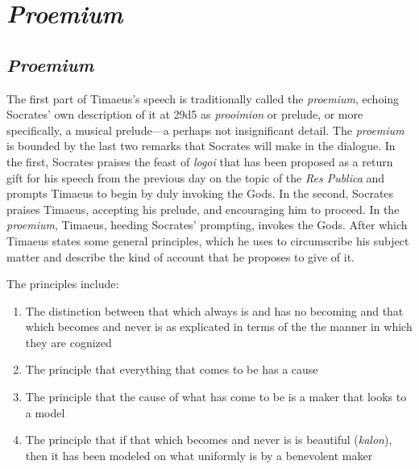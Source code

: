 
\chapter{\emph{Proemium}} %
\label{cha:proemium}

%
%


\section{\emph{Proemium}} %
\label{sec:proemium}

The first part of Timaeus's speech is traditionally called the \emph{proemium}, echoing Socrates' own description of it at 29d5 as \emph{prooimion} or prelude, or more specifically, a musical prelude---a perhaps not insignificant detail. The \emph{proemium} is bounded by the last two remarks that Socrates will make in the dialogue. In the first, Socrates praises the feast of \emph{logoi} that has been proposed as a return gift for his speech from the previous day on the topic of the \emph{Res Publica} and prompts Timaeus to begin by duly invoking the Gods. In the second, Socrates praises Timaeus, accepting his prelude, and encouraging him to proceed. In the \emph{proemium}, Timaeus, heeding Socrates' prompting, invokes the Gods. After which Timaeus states some general principles, which he uses to circumscribe his subject matter and describe the kind of account that he proposes to give of it. 

The principles include:
\begin{enumerate}[(1)]
	\item The distinction between that which always is and has no becoming and that which becomes and never is as explicated in terms of the the manner in which they are cognized
	\item The principle that everything that comes to be has a cause
	\item The principle that the cause of what has come to be is a maker that looks to a model
	\item The principle that if that which becomes and never is is beautiful (\emph{kalon}), then it has been modeled on what uniformly is by a benevolent maker
\end{enumerate}

